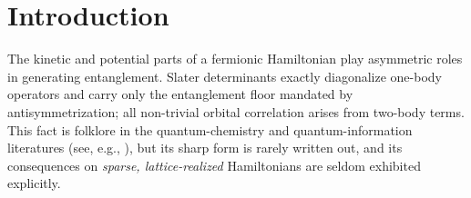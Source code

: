 \documentclass[twocolumn,pra,amsmath,amssymb,superscriptaddress]{revtex4-2}
\begin{document}
\begin{abstract}
nonzero and \emph{grows} with basis size.  Fifth, Coulomb-lattice
block entropy obeys a universal scaling
$S_B = A\,(\tilde{w}_B/\delta_B)^{\gamma}$, where
$\tilde{w}_B$ is the dimensionless $V_{ee}$ mass off-diagonal
in the one-body eigenbasis and $\delta_B$ the dimensionless
first $H_1$ gap; the local exponent extrapolates to
$\gamma_{\infty} \approx 1.96$--$1.97$ in the $n_{\max}\to\infty$ limit
in the $Z:15\to30$ window (extrapolated from $n_{\max}=2$--$7$ on helium-like
ions' physical Hamiltonian; fixed-$n_{\max}$ local slopes reach $1.91$ by
$Z=100$; an earlier $1.93$--$1.96$ was measured on a hop-augmented model
one-body operator), slightly below the
non-degenerate second-order Rayleigh--Schr\"odinger value of
$2$.  The gap is the logarithm in the von Neumann entropy:
$S\approx\varepsilon\ln(1/\varepsilon)$ with a correlation weight
$\varepsilon$ that scales at the second-order rate, so at fixed
$n_{\max}$ the local exponent returns slowly to $2$ as $Z\to\infty$.  Entropy is slotted into the
exchange-constant taxonomy as a projection-class observable:
zero on the combinatorial graph (non-degenerate case), finite only after the metric
embedding of $1/r_{12}$.
\end{abstract}

\maketitle

\section{Introduction}
\label{sec:intro}

The kinetic and potential parts of a fermionic Hamiltonian play
asymmetric roles in generating entanglement.  Slater determinants
exactly diagonalize one-body operators and carry only the
entanglement floor mandated by antisymmetrization; all
non-trivial orbital correlation arises from two-body terms.  This
fact is folklore in the quantum-chemistry and quantum-information
literatures (see, e.g., \cite{Peschel2003,LiHaldane2008}), but its
sharp form is rarely written out, and its consequences on
\emph{sparse, lattice-realized} Hamiltonians are seldom exhibited
explicitly.
\end{document}
